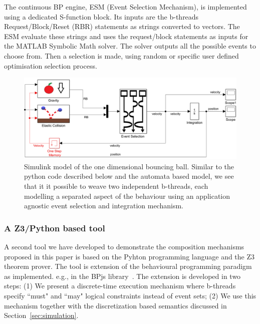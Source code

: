 \documentclass[11pt]{article}
\begin{document}
The continuous BP engine, ESM (Event Selection Mechanism), is implemented using a dedicated S-function block. Its inputs are the b-threads Request/Block/Reset (RBR) statements as strings converted to vectors. The ESM evaluate these strings and uses the request/block statements as inputs for the MATLAB Symbolic Math solver. The solver outputs all the possible events to choose from. Then a selection is made, using random or specific user defined optimisation selection process.   

\begin{figure}[ht]
	\centering
	\includegraphics[width=\columnwidth]{ODBB.png}
	\caption{Simulink model of the one dimensional bouncing ball. Similar to the python code described below and the automata based model, we see that it it possible to weave two independent b-threads, each modelling a separated aspect of the behaviour using an application agnostic event selection and integration mechanism.}
	\label{fig:bouncing ball}
\end{figure}

\subsubsection{A Z3/Python based tool}
\label{sec:Z3}

A second tool we have developed to demonstrate the composition mechanisms proposed in this paper is based on the Pyhton programming language and the Z3 theorem prover. The tool is extension of the behavioural programming paradigm as implemented. e.g., in the BPjs library~\cite{Ashrov2015}. The extension is developed  in two steps: (1) We present a discrete-time execution mechanism where b-threads specify ``must" and ``may" logical constraints instead of event sets; (2) We use this mechanism together with the discretization based semantics discussed in Section~\ref{sec:simulation}.
\end{document}

